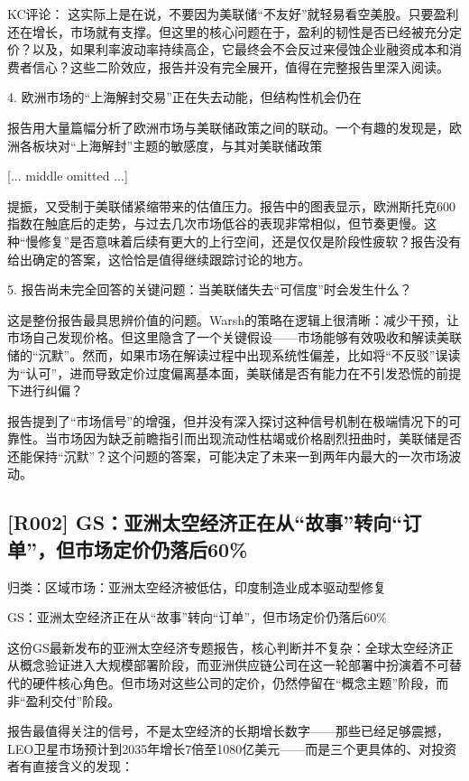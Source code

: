 \documentclass[11pt]{ctexart}
\begin{document}
KC评论： 这实际上是在说，不要因为美联储“不友好”就轻易看空美股。只要盈利还在增长，市场就有支撑。但这里的核心问题在于，盈利的韧性是否已经被充分定价？以及，如果利率波动率持续高企，它最终会不会反过来侵蚀企业融资成本和消费者信心？这些二阶效应，报告并没有完全展开，值得在完整报告里深入阅读。

4. 欧洲市场的“上海解封交易”正在失去动能，但结构性机会仍在

报告用大量篇幅分析了欧洲市场与美联储政策之间的联动。一个有趣的发现是，欧洲各板块对“上海解封”主题的敏感度，与其对美联储政策

[... middle omitted ...]

提振，又受制于美联储紧缩带来的估值压力。报告中的图表显示，欧洲斯托克600指数在触底后的走势，与过去几次市场低谷的表现非常相似，但节奏更慢。这种“慢修复”是否意味着后续有更大的上行空间，还是仅仅是阶段性疲软？报告没有给出确定的答案，这恰恰是值得继续跟踪讨论的地方。

5. 报告尚未完全回答的关键问题：当美联储失去“可信度”时会发生什么？

这是整份报告最具思辨价值的问题。Warsh的策略在逻辑上很清晰：减少干预，让市场自己发现价格。但这里隐含了一个关键假设——市场能够有效吸收和解读美联储的“沉默”。然而，如果市场在解读过程中出现系统性偏差，比如将“不反驳”误读为“认可”，进而导致定价过度偏离基本面，美联储是否有能力在不引发恐慌的前提下进行纠偏？

报告提到了“市场信号”的增强，但并没有深入探讨这种信号机制在极端情况下的可靠性。当市场因为缺乏前瞻指引而出现流动性枯竭或价格剧烈扭曲时，美联储是否还能保持“沉默”？这个问题的答案，可能决定了未来一到两年内最大的一次市场波动。

\subsection{[R002] GS：亚洲太空经济正在从“故事”转向“订单”，但市场定价仍落后60\%}
{\small\color{refgray}归类：区域市场：亚洲太空经济被低估，印度制造业成本驱动型修复}

GS：亚洲太空经济正在从“故事”转向“订单”，但市场定价仍落后60\%

这份GS最新发布的亚洲太空经济专题报告，核心判断并不复杂：全球太空经济正从概念验证进入大规模部署阶段，而亚洲供应链公司在这一轮部署中扮演着不可替代的硬件核心角色。但市场对这些公司的定价，仍然停留在“概念主题”阶段，而非“盈利交付”阶段。

报告最值得关注的信号，不是太空经济的长期增长数字——那些已经足够震撼，LEO卫星市场预计到2035年增长7倍至1080亿美元——而是三个更具体的、对投资者有直接含义的发现：
\end{document}

